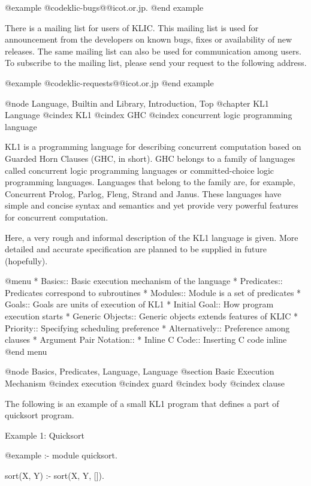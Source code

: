 @example
@code{klic-bugs@@icot.or.jp}.
@end example

There is a mailing list for users of KLIC.  This mailing list is used
for announcement from the developers on known bugs, fixes or
availability of new releases.  The same mailing list can also be used
for communication among users.  To subscribe to the mailing list, please
send your request to the following address.

@example
@code{klic-requests@@icot.or.jp}
@end example

@node Language, Builtin and Library, Introduction, Top
@chapter KL1 Language
@cindex KL1
@cindex GHC
@cindex concurrent logic programming language

KL1 is a programming language for describing concurrent computation
based on Guarded Horn Clauses (GHC, in short).  GHC belongs to a family
of languages called concurrent logic programming languages or
committed-choice logic programming languages.  Languages that belong to
the family are, for example, Concurrent Prolog, Parlog, Fleng, Strand
and Janus.  These languages have simple and concise syntax and semantics
and yet provide very powerful features for concurrent computation.

Here, a very rough and informal description of the KL1 language is
given.  More detailed and accurate specification are planned to be
supplied in future (hopefully).

@menu
* Basics::                      Basic execution mechanism of the language
* Predicates::                  Predicates correspond to subroutines
* Modules::                     Module is a set of predicates
* Goals::                       Goals are units of execution of KL1
* Initial Goal::                How program execution starts
* Generic Objects::             Generic objects extends features of KLIC
* Priority::                    Specifying scheduling preference
* Alternatively::               Preference among clauses
* Argument Pair Notation::      
* Inline C Code::               Inserting C code inline
@end menu

@node Basics, Predicates, Language, Language
@section Basic Execution Mechanism
@cindex execution
@cindex guard
@cindex body
@cindex clause

The following is an example of a small KL1 program that defines a part
of quicksort program.

Example 1: Quicksort

@example
:- module quicksort.

sort(X, Y) :- sort(X, Y, []).

